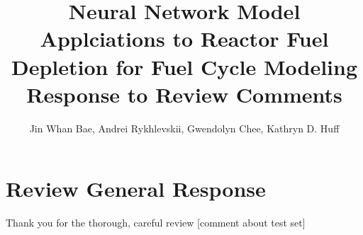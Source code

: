 \documentclass[answers,11pt]{exam}
\begin{document}


%

\title{Neural Network Model Applciations to Reactor Fuel Depletion for Fuel Cycle Modeling\\
        \large Response to Review Comments}
\author{Jin Whan Bae, Andrei Rykhlevskii, Gwendolyn Chee, Kathryn D. Huff}



%
\maketitle
\section*{Review General Response}
Thank you for the thorough, careful review
[comment about test set]
\end{document}
